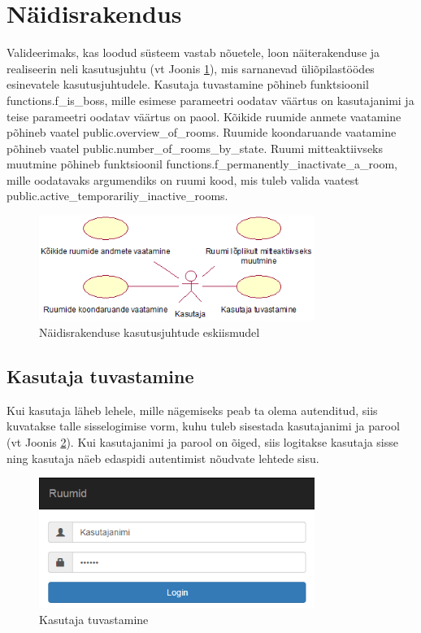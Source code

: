 \documentclass[a4paper,12pt]{article} %
\begin{document}
\section{Näidisrakendus}
Valideerimaks, kas loodud süsteem vastab nõuetele, loon näiterakenduse ja realiseerin neli kasutusjuhtu (vt Joonis \ref{fig_näidisrakendus_kasutusjuhtude_eskiismudel}), mis sarnanevad üliõpilastöödes esinevatele kasutusjuhtudele. Kasutaja tuvastamine põhineb funktsioonil functions.f\_is\_boss, mille esimese parameetri oodatav väärtus on kasutajanimi ja teise parameetri oodatav väärtus on paool. Kõikide ruumide anmete vaatamine põhineb vaatel public.overview\_of\_rooms. Ruumide koondaruande vaatamine põhineb vaatel public.number\_of\_rooms\_by\_state. Ruumi mitteaktiivseks muutmine põhineb funktsioonil functions.f\_permanently\_inactivate\_a\_room, mille oodatavaks argumendiks on ruumi kood, mis tuleb valida vaatest \newline public.active\_temporariliy\_inactive\_rooms.
\begin{figure}[H]
\centering
\includegraphics[width=0.8\textwidth]{./diagrams/sample-application-use-case-diagram.png}
\caption{Näidisrakenduse kasutusjuhtude eskiismudel}
\label{fig_näidisrakendus_kasutusjuhtude_eskiismudel}
\end{figure}
\subsection{Kasutaja tuvastamine}
Kui kasutaja läheb lehele, mille nägemiseks peab ta olema autenditud, siis kuvatakse talle sisselogimise vorm, kuhu tuleb sisestada kasutajanimi ja parool (vt Joonis \ref{fig_näidisrakendus_kasutaja_tuvastamine}). Kui kasutajanimi ja parool on õiged, siis logitakse kasutaja sisse ning kasutaja näeb edaspidi autentimist nõudvate lehtede sisu.
\begin{figure}[H]
\centering
\includegraphics[width=0.8\textwidth]{./diagrams/sample-app-user-auth.png}
\caption{Kasutaja tuvastamine}
\label{fig_näidisrakendus_kasutaja_tuvastamine}
\end{figure}
\end{document}
